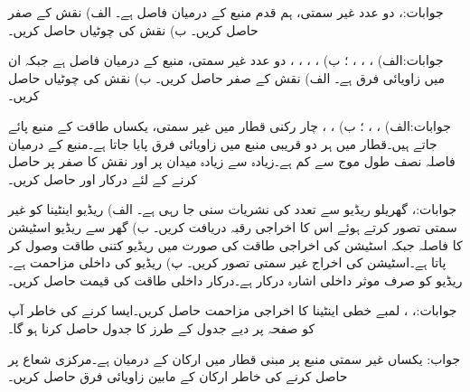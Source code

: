 جوابات:، 
دو عدد غیر سمتی، ہم قدم منبع کے درمیان فاصل  ہے۔ الف) نقش کے صفر حاصل کریں۔ ب) نقش کی چوٹیاں حاصل کریں۔

جوابات:الف) ، ، ، ؛ ب) ، ، ، ، 
دو عدد غیر سمتی، منبع کے درمیان فاصل  ہے جبکہ ان میں زاویائی فرق  ہے۔ الف) نقش کے صفر حاصل کریں۔ ب) نقش کی چوٹیاں حاصل کریں۔

جوابات:الف) ، ، ؛ ب) ، ، 
چار رکنی قطار میں غیر سمتی،  یکساں طاقت کے منبع پائے جاتے ہیں۔قطار میں ہر دو قریبی منبع میں  زاویائی فرق پایا جاتا ہے۔منبع کے درمیان فاصلہ نصف طول موج سے کم  ہے۔زیادہ سے زیادہ میدان  پر  اور نقش کا صفر  پر حاصل کرنے کے لئے درکار  اور  حاصل کریں۔ 

جوابات:، 
گھریلو ریڈیو سے  تعدد کی نشریات سنی جا رہی ہے۔ الف) ریڈیو اینٹینا کو غیر سمتی تصور کرتے ہوئے اس کا اخراجی رقبہ دریافت کریں۔ ب) گھر سے ریڈیو اسٹیشن کا فاصلہ  جبکہ اسٹیشن کی اخراجی طاقت  کی صورت میں ریڈیو کتنی طاقت وصول کر پاتا ہے۔اسٹیشن کی اخراج غیر سمتی تصور کریں۔ پ) ریڈیو کی داخلی مزاحمت  ہے۔ریڈیو کو صرف  موثر داخلی اشارہ درکار ہے۔درکار داخلی طاقت کی قیمت حاصل کریں۔  

جوابات:، ، 
 لمبے خطی اینٹینا کا اخراجی مزاحمت حاصل کریں۔ایسا کرنے کی خاطر آپ کو صفحہ  پر دیے جدول  کے طرز کا جدول حاصل کرنا ہو گا۔

جواب: 
یکساں غیر سمتی منبع پر مبنی قطار میں ارکان کے درمیان  ہے۔مرکزی شعاع  پر حاصل کرنے کی خاطر ارکان کے مابین زاویائی فرق  حاصل کریں۔ 

